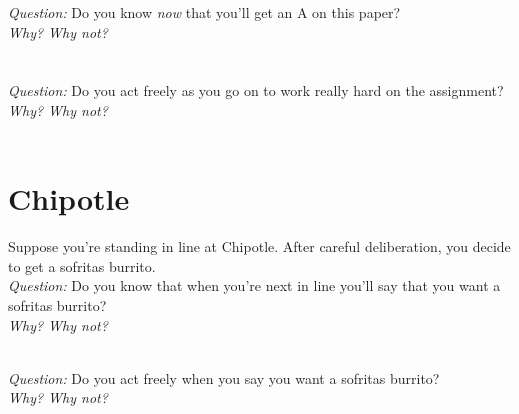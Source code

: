 \documentclass[justified]{tufte-handout}
\begin{document}
\noindent \emph{Question:} Do you know \emph{now} that you'll get an A on this paper?\\

\noindent \emph{Why? Why not?} \underline{\hspace{8.74cm}}\\\\\underline{\hspace{11.23cm}}\\

\noindent \noindent \emph{Question:} Do you act freely as you go on to work really hard on the assignment?\\

\noindent \emph{Why? Why not?} \underline{\hspace{8.74cm}}\\\\\underline{\hspace{11.23cm}}

\section{Chipotle}

Suppose you're standing in line at Chipotle. After careful deliberation, you decide to get a sofritas burrito.\\

\noindent \emph{Question:} Do you know that when you're next in line you'll say that you want a sofritas burrito?\\

\noindent \emph{Why? Why not?} \underline{\hspace{8.74cm}}\\\\\underline{\hspace{11.23cm}}

\noindent \emph{Question:} Do you act freely when you say you want a sofritas burrito?\\

\noindent \emph{Why? Why not?} \underline{\hspace{8.74cm}}\\\\\underline{\hspace{11.23cm}}





\end{document}
